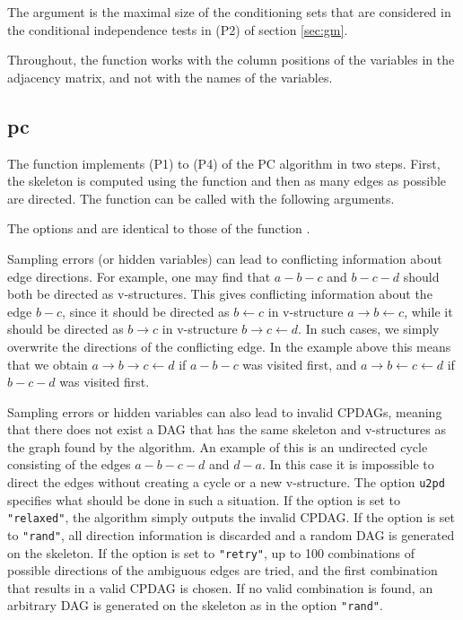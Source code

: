 \documentclass[article]{jss}
\begin{document}
The argument  is the maximal size of the conditioning sets that
are considered in the conditional independence tests in (P2) of section \ref{sec:gm}.
          
Throughout, the function works with the column positions of the
variables in the adjacency matrix, and not with the names of the variables.

\subsection{pc} \label{sec:pc}
The function  implements (P1) to (P4) of the PC
algorithm in two steps. First, the skeleton is computed using
the function  and then as many edges as possible are
directed. The function can be called with the following arguments.

     
The options  and  are identical to those of the
function .

Sampling errors (or hidden variables) can lead to conflicting information
about edge directions. For example, one may find that $a-b-c$ and $b-c-d$
should both be directed as v-structures.  This gives conflicting
information about the edge $b-c$, since it should be directed as $b
\leftarrow c$ in v-structure $a \rightarrow b \leftarrow c$, while it
should be directed as $b \rightarrow c$ in v-structure $b \rightarrow c
\leftarrow d$. In such cases, we simply overwrite the directions of the
conflicting edge. In the example above this means that we obtain $a
\rightarrow b \rightarrow c \leftarrow d$ if $a-b-c$ was visited first, and
$a \rightarrow b \leftarrow c \leftarrow d$ if $b-c-d$ was visited first.

Sampling errors or hidden variables can also lead to invalid CPDAGs,
meaning that there does not exist a DAG that has the same skeleton and
v-structures as the graph found by the algorithm. An example of this is an
undirected cycle consisting of the edges $a-b-c-d$ and $d-a$. In this case it
is impossible to direct the edges without creating a cycle or a new
v-structure. The option \texttt{u2pd} specifies what should be done in such a
situation. If the option is set to \texttt{"relaxed"}, the algorithm simply
outputs the invalid CPDAG. If the option is set to \texttt{"rand"}, all direction
information is discarded and a random DAG is generated on the skeleton. If
the option is set to \texttt{"retry"}, up to 100 combinations of possible
directions of the ambiguous edges are tried, and the first combination that
results in a valid CPDAG is chosen. If no valid combination is found, an
arbitrary DAG is generated on the skeleton as in the option \texttt{"rand"}.
\end{document}
